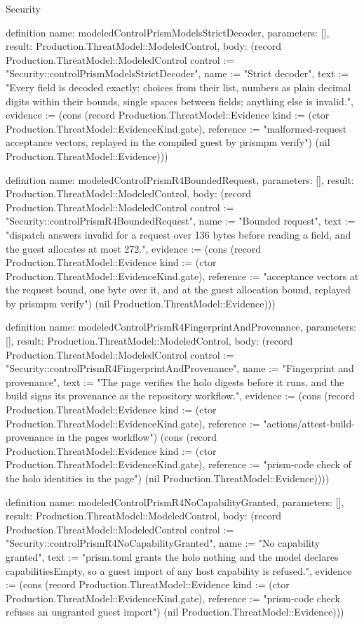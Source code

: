 \begin{lexlean}{Security}
\begin{semanticmodule}
definition{
  name: modeledControlPrismModelsStrictDecoder,
  parameters: [],
  result: Production.ThreatModel::ModeledControl,
  body: (record Production.ThreatModel::ModeledControl {control := "Security::controlPrismModelsStrictDecoder", name := "Strict decoder", text := "Every field is decoded exactly: choices from their list, numbers as plain decimal digits within their bounds, single spaces between fields; anything else is invalid.", evidence := (cons (record Production.ThreatModel::Evidence {kind := (ctor Production.ThreatModel::EvidenceKind.gate), reference := "malformed-request acceptance vectors, replayed in the compiled guest by prismpm verify"}) (nil Production.ThreatModel::Evidence))})
}

definition{
  name: modeledControlPrismR4BoundedRequest,
  parameters: [],
  result: Production.ThreatModel::ModeledControl,
  body: (record Production.ThreatModel::ModeledControl {control := "Security::controlPrismR4BoundedRequest", name := "Bounded request", text := "dispatch answers invalid for a request over 136 bytes before reading a field, and the guest allocates at most 272.", evidence := (cons (record Production.ThreatModel::Evidence {kind := (ctor Production.ThreatModel::EvidenceKind.gate), reference := "acceptance vectors at the request bound, one byte over it, and at the guest allocation bound, replayed by prismpm verify"}) (nil Production.ThreatModel::Evidence))})
}

definition{
  name: modeledControlPrismR4FingerprintAndProvenance,
  parameters: [],
  result: Production.ThreatModel::ModeledControl,
  body: (record Production.ThreatModel::ModeledControl {control := "Security::controlPrismR4FingerprintAndProvenance", name := "Fingerprint and provenance", text := "The page verifies the holo digests before it runs, and the build signs its provenance as the repository workflow.", evidence := (cons (record Production.ThreatModel::Evidence {kind := (ctor Production.ThreatModel::EvidenceKind.gate), reference := "actions/attest-build-provenance in the pages workflow"}) (cons (record Production.ThreatModel::Evidence {kind := (ctor Production.ThreatModel::EvidenceKind.gate), reference := "prism-code check of the holo identities in the page"}) (nil Production.ThreatModel::Evidence)))})
}

definition{
  name: modeledControlPrismR4NoCapabilityGranted,
  parameters: [],
  result: Production.ThreatModel::ModeledControl,
  body: (record Production.ThreatModel::ModeledControl {control := "Security::controlPrismR4NoCapabilityGranted", name := "No capability granted", text := "prism.toml grants the holo nothing and the model declares capabilitiesEmpty, so a guest import of any host capability is refused.", evidence := (cons (record Production.ThreatModel::Evidence {kind := (ctor Production.ThreatModel::EvidenceKind.gate), reference := "prism-code check refuses an ungranted guest import"}) (nil Production.ThreatModel::Evidence))})
}


\end{semanticmodule}
\end{lexlean}
